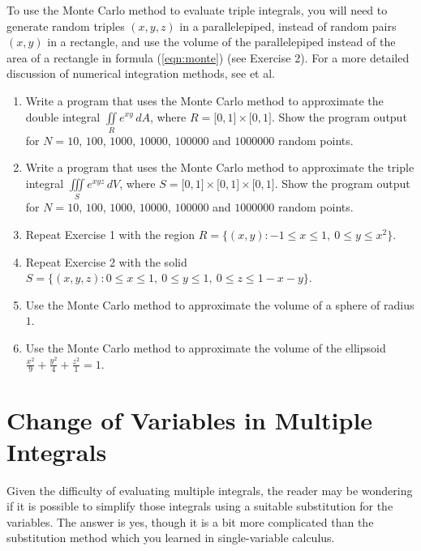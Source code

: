 To use the Monte Carlo method to evaluate triple integrals, you will need to generate random triples $(x,y,z)$ in a
parallelepiped, instead of random pairs $(x,y)$ in a rectangle, and use the volume of the parallelepiped instead of the
area of a rectangle in formula (\ref{eqn:monte}) (see Exercise 2). For a more detailed discussion of numerical
integration methods, see \cite{ptvf} et al.\vspace{-3mm}
\startexercises\label{sec3dot4}
\begin{enumerate}[\bfseries 1.]
 \item Write a program that uses the Monte Carlo method to approximate the double integral
  $\iint\limits_{R} e^{xy}\,dA$, where $R = \lbrack 0,1 \rbrack \times \lbrack 0,1 \rbrack$. Show the program output
  for $N=10$, $100$, $1000$, $10000$, $100000$ and $1000000$ random points.
 \item Write a program that uses the Monte Carlo method to approximate the triple integral
  $\iiint\limits_{S} e^{xyz}\,dV$, where $S= \lbrack 0,1 \rbrack \times \lbrack 0,1 \rbrack \times \lbrack 0,1 \rbrack$.
  Show the program output for $N=10$, $100$, $1000$, $10000$, $100000$ and $1000000$ random points.
 \item Repeat Exercise 1 with the region $R = \lbrace (x,y): -1 \le x \le 1,~ 0 \le y \le x^2 \rbrace$.
 \item Repeat Exercise 2 with the solid $S = \lbrace (x,y,z): 0 \le x \le 1,~ 0 \le y \le 1,~
  0 \le z \le 1 - x - y \rbrace$.
 \item Use the Monte Carlo method to approximate the volume of a sphere of radius $1$.
 \item Use the Monte Carlo method to approximate the volume of the ellipsoid $\frac{x^2}{9}+\frac{y^2}{4}+
  \frac{z^2}{1}=1$.
\end{enumerate}
\newpage
\section{Change of Variables in Multiple Integrals}
Given the difficulty of evaluating multiple integrals, the reader may be wondering if it is possible to simplify
those integrals using a suitable substitution for the variables. The answer is yes, though it is a bit more complicated
than the substitution method which you learned in single-variable calculus.

